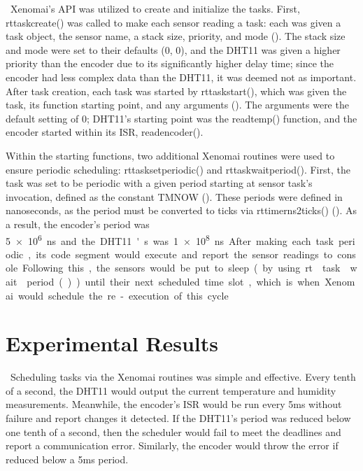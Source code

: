 \documentclass[letterpaper, 12pt]{article}
\begin{document}
~\indent Xenomai's API was utilized to create and initialize the tasks.  First, rt\textunderscore task\textunderscore create() was called to make each sensor reading a task: each was given a task object, the sensor name, a stack size, priority, and mode (\cite{xenomai2018}).  The stack size and mode were set to their defaults (0, 0), and the DHT11 was given a higher priority than the encoder due to its significantly higher delay time; since the encoder had less complex data than the DHT11, it was deemed not as important.  After task creation, each task was started by rt\textunderscore task\textunderscore start(), which was given the task, its function starting point, and any arguments (\cite{xenomai2018}).  The arguments were the default setting of 0; DHT11's starting point was the read\textunderscore temp() function, and the encoder started within its ISR, read\textunderscore encoder().

\indent Within the starting functions, two additional Xenomai routines were used to ensure periodic scheduling: rt\textunderscore task\textunderscore set\textunderscore periodic() and rt\textunderscore task\textunderscore wait\textunderscore period().  First, the task was set to be periodic with a given period starting at sensor task's invocation, defined as the constant TM\textunderscore NOW (\cite{xenomai2018}).  These periods were defined in nanoseconds, as the period must be converted to ticks via rt\textunderscore timer\textunderscore ns2ticks() (\cite{xenomai2018}).  As a result, the encoder's period was \SI{5e6} ns and the DHT11's was \SI{1e8} ns.  After making each task periodic, its code segment would execute and report the sensor readings to console.  Following this, the sensors would be put to sleep (by using rt\textunderscore task\textunderscore wait\textunderscore period()) until their next scheduled time slot, which is when Xenomai would schedule the re-execution of this cycle.

~\newpage

\section{Experimental Results}

~\indent Scheduling tasks via the Xenomai routines was simple and effective.  Every tenth of a second, the DHT11 would output the current temperature and humidity measurements.  Meanwhile, the encoder's ISR would be run every 5ms without failure and report changes it detected.  If the DHT11's period was reduced below one tenth of a second, then the scheduler would fail to meet the deadlines and report a communication error.  Similarly, the encoder would throw the error if reduced below a 5ms period.  
\end{document}
